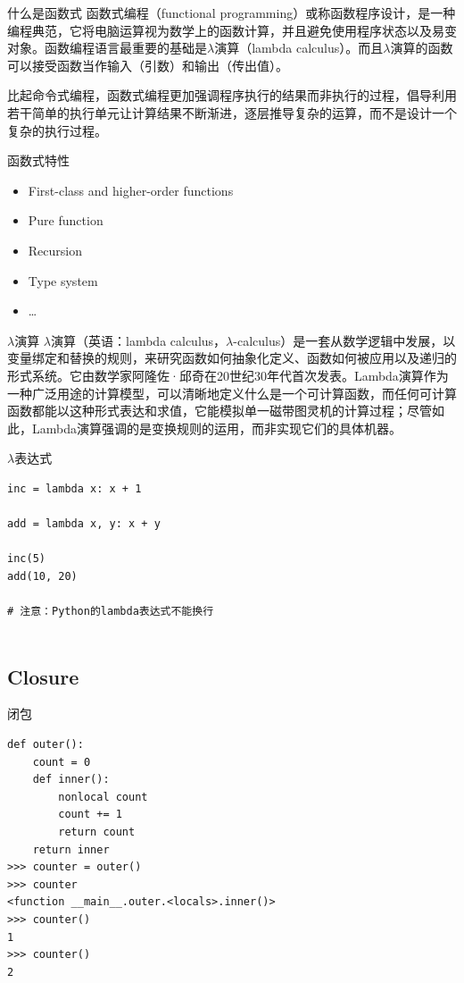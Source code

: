 \documentclass{beamer}
\begin{document}
\begin{frame}[t]{什么是函数式}
    函数式编程（functional programming）或称函数程序设计，是一种编程典范，它将电脑运算视为数学上的函数计算，并且避免使用程序状态以及易变对象。函数编程语言最重要的基础是$\lambda$演算（lambda calculus）。而且$\lambda$演算的函数可以接受函数当作输入（引数）和输出（传出值）。

    比起命令式编程，函数式编程更加强调程序执行的结果而非执行的过程，倡导利用若干简单的执行单元让计算结果不断渐进，逐层推导复杂的运算，而不是设计一个复杂的执行过程。
\end{frame}

\begin{frame}[t]{函数式特性}
    \begin{itemize}
        \item First-class and higher-order functions
        \item Pure function
        \item Recursion
        \item Type system
				\item \ldots

            
    \end{itemize}
\end{frame}

\begin{frame}[t]{$\lambda$演算}
    $\lambda$演算（英语：lambda calculus，$\lambda$-calculus）是一套从数学逻辑中发展，以变量绑定和替换的规则，来研究函数如何抽象化定义、函数如何被应用以及递归的形式系统。它由数学家阿隆佐·邱奇在20世纪30年代首次发表。Lambda演算作为一种广泛用途的计算模型，可以清晰地定义什么是一个可计算函数，而任何可计算函数都能以这种形式表达和求值，它能模拟单一磁带图灵机的计算过程；尽管如此，Lambda演算强调的是变换规则的运用，而非实现它们的具体机器。
\end{frame}

\begin{frame}[t,fragile]{$\lambda$表达式}
\begin{verbatim}
inc = lambda x: x + 1

add = lambda x, y: x + y

inc(5)
add(10, 20)

# 注意：Python的lambda表达式不能换行


\end{verbatim}
	
\end{frame}

\subsection{Closure}
\label{sub:Closure}
\begin{frame}[t,fragile]{闭包}
    
\begin{verbatim}
def outer():
    count = 0
    def inner():
        nonlocal count
        count += 1
        return count
    return inner
>>> counter = outer()
>>> counter
<function __main__.outer.<locals>.inner()>
>>> counter()
1
>>> counter()
2

\end{verbatim}
\end{frame}
\end{document}
